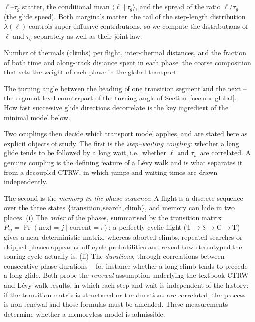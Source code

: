 \begin{description}
        $\ell$--$\tau_g$ scatter, the conditional mean $\langle\ell\mid\tau_g\rangle$, and the
        spread of the ratio $\ell/\tau_g$ (the glide speed). Both marginals matter: the tail of
        the step-length distribution $\lambda(\ell)$ controls super-diffusive contributions, so
        we compute the distributions of $\ell$ and $\tau_g$ separately as well as their joint
        law.
  \item[Anatomy of a flight.] Number of thermals (climbs) per flight, inter-thermal distances,
        and the fraction of both time and along-track distance spent in each phase: the coarse
        composition that sets the weight of each phase in the global transport.
  \item[Angular diffusion between glides.] The turning angle between the heading of one
        transition segment and the next -- the segment-level counterpart of the turning angle
        of Section~\ref{sec:obs-global}. How fast successive glide directions decorrelate is
        the key ingredient of the minimal model below.
\end{description}

Two couplings then decide which transport model applies, and are stated here as explicit
objects of study. The first is the \emph{step--waiting coupling}: whether a long glide tends
to be followed by a long wait, i.e.\ whether $\ell$ and $\tau_w$ are correlated. A genuine
coupling is the defining feature of a L\'evy walk and is what separates it from a decoupled
CTRW, in which jumps and waiting times are drawn independently.

The second is the \emph{memory in the phase sequence}. A flight is a discrete sequence over
the three states $\{\text{transition},\text{search},\text{climb}\}$, and memory can hide in
two places. (i) The \emph{order} of the phases, summarised by the transition matrix
$P_{ij}=\Pr(\text{next}=j\mid\text{current}=i)$: a perfectly cyclic flight
($\text{T}\!\to\!\text{S}\!\to\!\text{C}\!\to\!\text{T}$) gives a near-deterministic matrix,
whereas aborted climbs, repeated searches or skipped phases appear as off-cycle probabilities
and reveal how stereotyped the soaring cycle actually is. (ii) The \emph{durations}, through
correlations between consecutive phase durations -- for instance whether a long climb tends to
precede a long glide. Both probe the \emph{renewal} assumption underlying the textbook CTRW
and L\'evy-walk results, in which each step and wait is independent of the history: if the
transition matrix is structured or the durations are correlated, the process is non-renewal
and those formulas must be amended. These measurements determine whether a memoryless
model is admissible.

